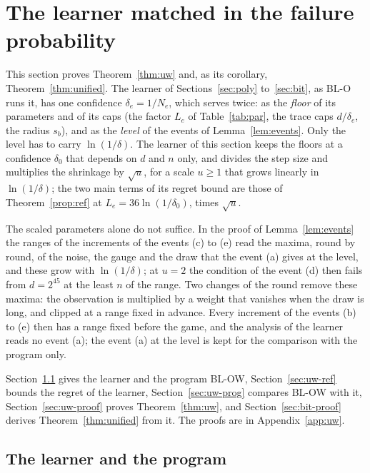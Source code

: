 \documentclass[11pt]{amsart}
\theoremstyle{definition}
\numberwithin{equation}{section}
\begin{document}
\section{The learner matched in the failure probability}\label{sec:uw}

This section proves Theorem~\ref{thm:uw} and, as its corollary, Theorem~\ref{thm:unified}. The learner of Sections~\ref{sec:poly} to~\ref{sec:bit}, as BL-O runs it, has one confidence $\delta_e=1/N_e$, which serves twice: as the \emph{floor} of its parameters and of its caps (the factor $L_e$ of Table~\ref{tab:par}, the trace caps $d/\delta_e$, the radius $s_b$), and as the \emph{level} of the events of Lemma~\ref{lem:events}. Only the level has to carry $\ln(1/\delta)$. The learner of this section keeps the floors at a confidence $\delta_0$ that depends on $d$ and $n$ only, and divides the step size and multiplies the shrinkage by $\sqrt u$, for a scale $u\ge1$ that grows linearly in $\ln(1/\delta)$; the two main terms of its regret bound are those of Theorem~\ref{prop:ref} at $L_e=36\ln(1/\delta_0)$, times $\sqrt u$.

The scaled parameters alone do not suffice. In the proof of Lemma~\ref{lem:events} the ranges of the increments of the events (c) to (e) read the maxima, round by round, of the noise, the gauge and the draw that the event (a) gives at the level, and these grow with $\ln(1/\delta)$; at $u=2$ the condition of the event (d) then fails from $d=2^{45}$ at the least $n$ of the range. Two changes of the round remove these maxima: the observation is multiplied by a weight that vanishes when the draw is long, and clipped at a range fixed in advance. Every increment of the events (b) to (e) then has a range fixed before the game, and the analysis of the learner reads no event (a); the event (a) at the level is kept for the comparison with the program only.

Section~\ref{sec:uw-learner} gives the learner and the program BL-OW, Section~\ref{sec:uw-ref} bounds the regret of the learner, Section~\ref{sec:uw-prog} compares BL-OW with it, Section~\ref{sec:uw-proof} proves Theorem~\ref{thm:uw}, and Section~\ref{sec:bit-proof} derives Theorem~\ref{thm:unified} from it. The proofs are in Appendix~\ref{app:uw}.

\subsection{The learner and the program}\label{sec:uw-learner}
\end{document}
